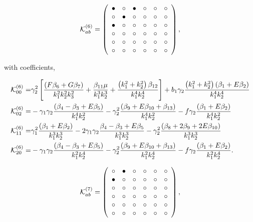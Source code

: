 \begin{equation}
	\mathcal{K}^{(6)}_{ab} = 
 \left( \begin {array}{cccccc} \bullet &\circ &\bullet &\circ 
&\circ &\circ \\  \circ &\bullet &\circ &
\circ &\circ &\circ \\  \bullet &\circ &
\circ &\circ &\circ &\circ \\  \circ &
\circ &\circ &\circ &\circ &\circ \\  
\circ &\circ &\circ &\circ &\circ &\circ 
\\  \circ &\circ &\circ &\circ &\circ &
\circ \end {array} \right), 
\end{equation}

with coefficients, 

\begin{align*}
\mathcal{K}_{00}^{(6)}=& \gamma_2^2 \left[ \frac{\left( F \beta_{6} + G \beta_{7} \right)}{k_1^2 k_2^2 k_3^2} + \frac{\beta_{11} \mu}{k_1^3 k_2^3} + \frac{\left( k_1^2 + k_2^2 \right) \beta_{12}}{k_1^4 k_2^4} \right] + b_1 \gamma_2 \frac{\left( k_1^2 + k_2^2\right) \left( \beta_1 + E \beta_2 \right)}{k_1^4 k_2^4}\\
\mathcal{K}_{02}^{(6)}=& - \gamma_1 \gamma_2 \frac{\left( {\beta_{4}-\beta_{3}} + E \beta_{5} \right)}{k_1^4 k_2^2} - \gamma_2^2 \frac{\left( \beta_{9} + E \beta_{10} + \beta_{13} \right)}{k_1^4 k_2^2} - f \gamma_2 \frac{\left( \beta_1 + E \beta_2 \right)}{k_1^4 k_2^2} \\
\mathcal{K}_{11}^{(6)}=& \gamma_1^2 \frac{\left( \beta_1 + E \beta_2 \right)}{k_1^3 k_2^3} - 2 \gamma_1 \gamma_2 \frac{{\beta_{4}-\beta_{3}} + E \beta_{5}}{k_1^3 k_2^3} - \gamma_2^2 \frac{\left( \beta_{8} + 2 \beta_{9} + 2 E \beta_{10} \right)}{k_1^3 k_2^3} \\
\mathcal{K}_{20}^{(6)}=& - \gamma_1 \gamma_2 \frac{\left( {\beta_{4}-\beta_{3}} + E \beta_{5} \right)}{k_1^2 k_2^4} - \gamma_2^2 \frac{\left( \beta_{9} + E \beta_{10} + \beta_{13} \right)}{k_1^2 k_2^4} - f \gamma_2 \frac{\left( \beta_1 + E \beta_2 \right)}{k_1^2 k_2^4} .
\end{align*}

\begin{equation}
	\mathcal{K}^{(7)}_{ab}= 
 \left( \begin {array}{cccccc} \circ &\bullet &\circ &\circ &
\circ &\circ \\  \bullet &\circ &\circ &
\circ &\circ &\circ \\  \circ &\circ &
\circ &\circ &\circ &\circ \\  \circ &
\circ &\circ &\circ &\circ &\circ \\  
\circ &\circ &\circ &\circ &\circ &\circ 
\\  \circ &\circ &\circ &\circ &\circ &
\circ \end {array} \right), 
\end{equation}

